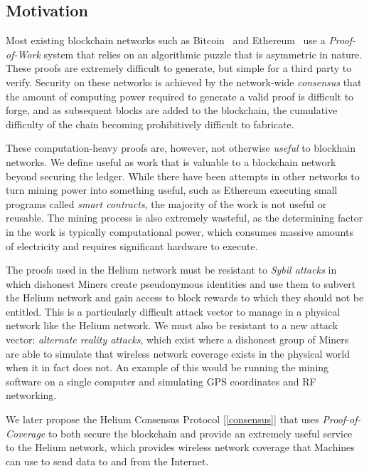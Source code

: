 \documentclass[10pt, nonatbib, nocopyrightspace, reprint]{sigplanconf}
\newcommand{\secref}[1]{[\autoref{#1}]}
\begin{document}
\subsection{Motivation}

Most existing blockchain networks such as Bitcoin~\cite{bitcoin} and Ethereum~\cite{ethereum} use a \emph{Proof-of-Work} system that relies on an algorithmic puzzle that is asymmetric in nature. These proofs are extremely difficult to generate, but simple for a third party to verify. Security on these networks is achieved by the network-wide \emph{consensus} that the amount of computing power required to generate a valid proof is difficult to forge, and as subsequent blocks are added to the blockchain, the cumulative difficulty of the chain becoming prohibitively difficult to fabricate.

These computation-heavy proofs are, however, not otherwise \emph{useful} to blockhain networks. We define useful as work that is valuable to a blockchain network beyond securing the ledger. While there have been attempts in other networks to turn mining power into something useful, such as Ethereum executing small programs called \emph{smart contracts}, the majority of the work is not useful or reusable. The mining process is also extremely wasteful, as the determining factor in the work is typically computational power, which consumes massive amounts of electricity and requires significant hardware to execute.

The proofs used in the Helium network must be resistant to \emph{Sybil attacks} in which dishonest Miners create pseudonymous identities and use them to subvert the Helium network and gain access to block rewards to which they should not be entitled. This is a particularly difficult attack vector to manage in a physical network like the Helium network. We must also be resistant to a new attack vector: \emph{alternate reality attacks}, which exist where a dishonest group of Miners are able to simulate that wireless network coverage exists in the physical world when it in fact does not. An example of this would be running the mining software on a single computer and simulating GPS coordinates and RF networking.

We later propose the Helium Consensus Protocol \secref{consensus} that uses \emph{Proof-of-Coverage} to both secure the blockchain and provide an extremely useful service to the Helium network, which provides wireless network coverage that Machines can use to send data to and from the Internet.
\end{document}
